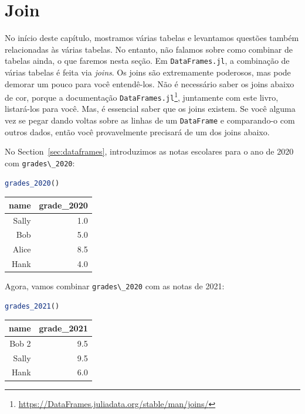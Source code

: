 \documentclass[
  notoc %
]{tufte-book}
\DeclareRobustCommand{\href}[2]{#2\footnote{\url{#1}}}
\newcommand{\passthrough}[1]{#1}
\begin{document}
\hypertarget{sec:join}{%
\section{Join}\label{sec:join}}

No início deste capítulo, mostramos várias tabelas e levantamos questões
também relacionadas às várias tabelas. No entanto, não falamos sobre
como combinar de tabelas ainda, o que faremos nesta seção. Em
\passthrough{\lstinline!DataFrames.jl!}, a combinação de várias tabelas
é feita via \emph{joins}. Os joins são extremamente poderosos, mas pode
demorar um pouco para você entendê-los. Não é necessário saber os joins
abaixo de cor, porque a
\href{https://DataFrames.juliadata.org/stable/man/joins/}{documentação
\passthrough{\lstinline!DataFrames.jl!}}, juntamente com este livro,
listará-los para você. Mas, é essencial saber que os joins existem. Se
você alguma vez se pegar dando voltas sobre as linhas de um
\passthrough{\lstinline!DataFrame!} e comparando-o com outros dados,
então você provavelmente precisará de um dos joins abaixo.

No Section~\ref{sec:dataframes}, introduzimos as notas escolares para o
ano de 2020 com \passthrough{\lstinline!grades\_2020!}:

\begin{lstlisting}[language=Julia]
grades_2020()
\end{lstlisting}

\begin{longtable}[]{@{}rr@{}}
\toprule
name & grade\_2020 \\
\midrule
\endhead
Sally & 1.0 \\
Bob & 5.0 \\
Alice & 8.5 \\
Hank & 4.0 \\
\bottomrule
\end{longtable}

Agora, vamos combinar \passthrough{\lstinline!grades\_2020!} com as
notas de 2021:

\begin{lstlisting}[language=Julia]
grades_2021()
\end{lstlisting}

\begin{longtable}[]{@{}rr@{}}
\toprule
name & grade\_2021 \\
\midrule
\endhead
Bob 2 & 9.5 \\
Sally & 9.5 \\
Hank & 6.0 \\
\bottomrule
\end{longtable}
\end{document}

